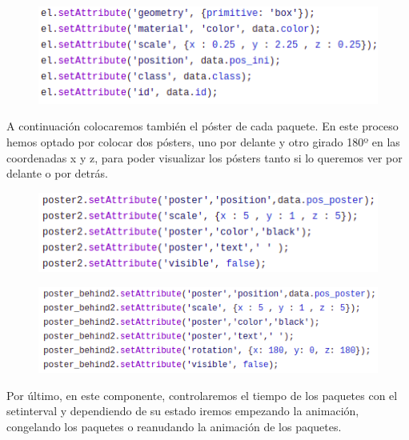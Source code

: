 \documentclass[a4paper, 12pt]{book}
\begin{document}
\begin{figure}[h]
\centering
    \includegraphics[scale=0.7]{img/elem_comp_pack.png}
\end{figure}

A continuación colocaremos también el póster de cada paquete. En este proceso hemos optado por colocar dos pósters, uno por delante y otro girado 180º en las coordenadas x y z, para poder visualizar los pósters tanto si lo queremos ver por delante o por detrás.

\begin{figure}[h]
\centering
    \includegraphics[scale=0.7]{img/postpack1_comp_pack.png}
\end{figure}

\begin{figure}[h]
\centering
    \includegraphics[scale=0.7]{img/postpack2_comp_pack.png}
\end{figure}

Por último, en este componente, controlaremos el tiempo de los paquetes con el setinterval y dependiendo de su estado iremos empezando la animación, congelando los paquetes o reanudando la animación de los paquetes.
\end{document}
